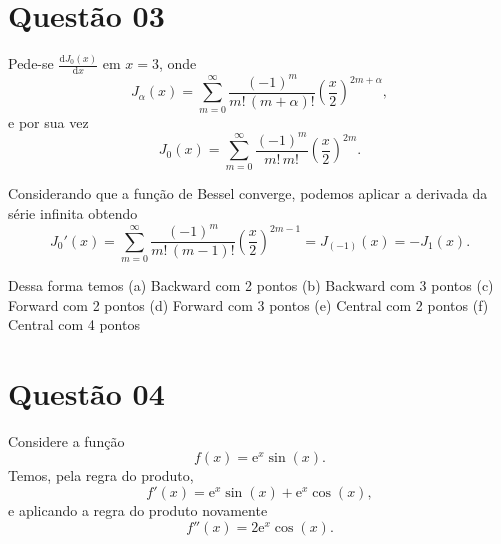 \documentclass{article}
\newcommand{\euler}{\mathrm{e}}
\begin{document}
\section{Questão 03}

Pede-se $\frac{\mathrm{d}J_0(x)}{\mathrm{d}x}$ em $x=3$, onde 
\[J_\alpha(x) = \sum_{m=0}^\infty \frac{(-1)^m}{m!\, (m+\alpha)!} {\left(\frac{x}{2}\right)}^{2m+\alpha},\]
e por sua vez
\[J_0(x) = \sum_{m=0}^\infty \frac{(-1)^m}{m!\, m!} {\left(\frac{x}{2}\right)}^{2m}.\]

Considerando que a função de Bessel converge, podemos aplicar a derivada da série infinita obtendo
\[J_0'(x) = \sum_{m=0}^\infty \frac{(-1)^m}{m!\, (m-1)!} {\left(\frac{x}{2}\right)}^{2m-1} = J_{(-1)}(x) = -J_1(x).\]

Dessa forma temos 
(a) Backward com 2 pontos
(b) Backward com 3 pontos
(c) Forward com 2 pontos
(d) Forward com 3 pontos
(e) Central com 2 pontos
(f) Central com 4 pontos

\section{Questão 04}
Considere a função 
\[ f(x) = \euler^x \sin(x).
\]
Temos, pela regra do produto, 
\[ f'(x) = \euler^x \sin(x) + \euler^x\cos(x),
\]
e aplicando a regra do produto novamente
\[ f''(x) =  2\euler^x\cos(x).
\]
\end{document}
